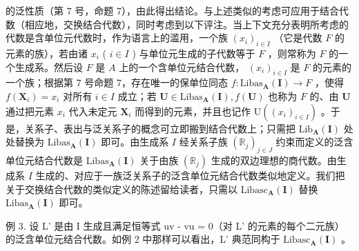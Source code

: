 的泛性质（第 7 号，命题 7），由此得出结论。与上述类似的考虑可应用于结合代数（相应地，交换结合代数），同时考虑到以下评注。当上下文充分表明所考虑的代数是含单位元代数时，作为语言上的滥用，一个族 \((x_{i})_{i\in I}\) （它是代数 \(F\) 的元素的族），若由诸 \(x_{i}\) ( \(i\in I\) ) 与单位元生成的子代数等于 \(F\) ，则常称为 \(F\) 的一个生成系。然后设 \(F\) 是 \(A\) 上的一个含单位元结合代数， \((x_{i})_{i\in I}\) 是 \(F\) 的元素的一个族；根据第 7 号命题 7，存在唯一的保单位同态 \(f:\mathrm{Libas}_{\mathbf{A}}(\mathbf{I})\to F\) ，使得 \(f(\mathbf{X}_i) = x_i\) 对所有 \(i\in I\) 成立；若 \(\mathbf{U}\in \mathrm{Libas}_{\mathbf{A}}(\mathbf{I}), f(\mathbf{U})\) 也称为 \(F\) 的、由 \(\mathbf{U}\) 通过把元素 \(x_{i}\) 代入未定元 \(\mathbf{X}_i\) 而得到的元素，并且也记作 \(\mathrm{U}((x_{i})_{i\in I})\) 。于是，关系子、表出与泛关系子的概念可立即搬到结合代数上；只需把 \(\mathrm{Lib}_{\mathbf{A}}(\mathbf{I})\) 处处替换为 \(\mathrm{Libas}_{\mathbf{A}}(\mathbf{I})\) 即可。由生成系 \(I\) 经关系子族 \((\mathbb{R}_j)_{j\in J}\) 约束而定义的泛含单位元结合代数是 \(\mathrm{Libas}_{\mathbf{A}}(\mathbf{I})\) 关于由族 \((\mathbb{R}_j)\) 生成的双边理想的商代数。由生成系 \(I\) 生成的、对应于一族泛关系子的泛含单位元结合代数类似地定义。我们把关于交换结合代数的类似定义的陈述留给读者，只需以 \(\mathrm{Libasc}_{\mathbf{A}}(\mathbf{I})\) 替换 \(\mathrm{Libas}_{\mathbf{A}}(\mathbf{I})\) 即可。

例 3. 设 L' 是由 I 生成且满足恒等式 uv - vu = 0（对 L' 的元素的每个二元族）的泛含单位元结合代数。如例 2 中那样可以看出，L' 典范同构于 \(\text{Libasc}_{\mathbf{A}}(\mathbf{I})\) 。

